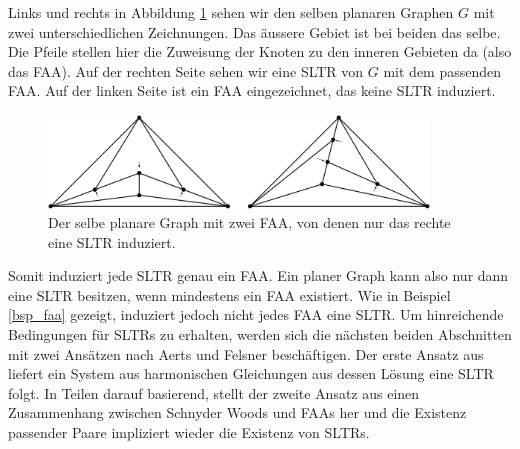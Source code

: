 \begin{example}\label{bsp_faa}
Links und rechts in Abbildung \ref{exp_faa} sehen wir den selben planaren Graphen $G$ mit zwei unterschiedlichen Zeichnungen. Das äussere Gebiet ist bei beiden das selbe. Die Pfeile stellen hier die Zuweisung der Knoten zu den inneren Gebieten da (also das FAA). Auf der rechten Seite sehen wir eine SLTR von $G$ mit dem passenden FAA. Auf der linken Seite ist ein FAA eingezeichnet, das keine SLTR induziert.

\begin{figure}[h]
	\centering
  \includegraphics[width=0.9\textwidth]{faa_def.png}
  \caption{Der selbe planare Graph mit zwei FAA, von denen nur das rechte eine SLTR induziert.}
  \label{exp_faa}
\end{figure}
\end{example}

Somit induziert jede SLTR genau ein FAA. Ein planer Graph kann also nur dann eine SLTR besitzen, wenn mindestens ein FAA existiert. Wie in Beispiel \ref{bsp_faa} gezeigt, induziert jedoch nicht jedes FAA eine SLTR. Um hinreichende Bedingungen für SLTRs zu erhalten, werden sich die nächsten beiden Abschnitten mit zwei Ansätzen nach Aerts und Felsner beschäftigen. Der erste Ansatz aus \cite{af13} liefert ein System aus harmonischen Gleichungen aus dessen Lösung eine SLTR folgt. In Teilen darauf basierend, stellt der zweite Ansatz aus \cite{af15} einen Zusammenhang zwischen Schnyder Woods und FAAs her und die Existenz passender Paare impliziert wieder die Existenz von SLTRs.



